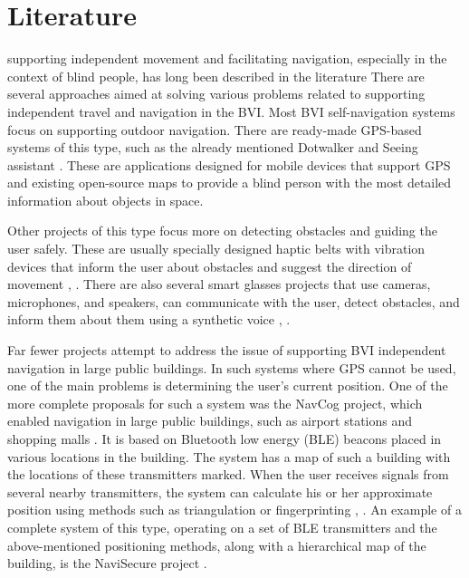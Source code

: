 \documentclass[conference]{IEEEtran}
\begin{document}
\section{Literature}
supporting independent movement and facilitating navigation, especially in the context of blind people, has long been described in the literature 
There are several approaches aimed at solving various problems related to supporting independent travel and navigation in the BVI.
Most BVI self-navigation systems focus on supporting outdoor navigation. 
There are ready-made GPS-based systems of this type, such as the already mentioned Dotwalker \cite{Dotwalker} and Seeing assistant \cite{SeeingAssistantMove}.
These are applications designed for mobile devices that support GPS and existing open-source maps to provide a blind person with the most detailed information about objects in space.

Other projects of this type focus more on detecting obstacles and guiding the user safely.
These are usually specially designed haptic belts with vibration devices that inform the user about obstacles and suggest the direction of movement \cite{haptic-worning2017}, \cite{haptik-interface2016}.
There are also several smart glasses projects that use cameras, microphones, and speakers, can communicate with the user, detect obstacles, and inform them about them using a synthetic voice \cite{APriyadharshini2025FaceAO}, \cite{ProfGiriP2025SmartGF}.

Far fewer projects attempt to address the issue of supporting BVI independent navigation in large public buildings.
In such systems where GPS cannot be used, one of the main problems is determining the user's current position.
One of the more complete proposals for such a system was the NavCog project, which enabled navigation in large public buildings, such as airport stations and shopping malls \cite{NavCog2016}.
It is based on Bluetooth low energy (BLE) beacons placed in various locations in the building.
The system has a map of such a building with the locations of these transmitters marked.
When the user receives signals from several nearby transmitters, the system can calculate his or her approximate position using methods such as triangulation or fingerprinting \cite{verma2016}, \cite{kriz2016}.
An example of a complete system of this type, operating on a set of BLE transmitters and the above-mentioned positioning methods, along with a hierarchical map of the building, is the NaviSecure project \cite{Navisecure}.
\end{document}

